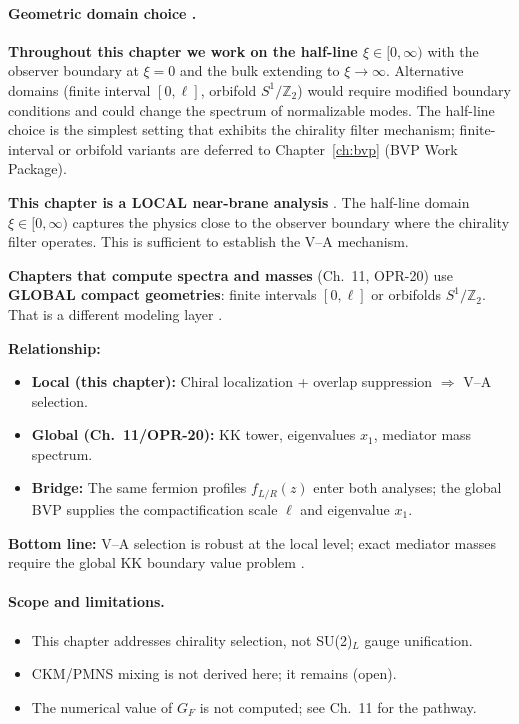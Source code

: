 \paragraph{Geometric domain choice \tagP{}.}
\textbf{Throughout this chapter we work on the half-line $\xi \in [0, \infty)$} with
the observer boundary at $\xi = 0$ and the bulk extending to $\xi \to \infty$.
Alternative domains (finite interval $[0, \ell]$, orbifold $S^1/\mathbb{Z}_2$)
would require modified boundary conditions and could change the spectrum of
normalizable modes. The half-line choice is the simplest setting that exhibits
the chirality filter mechanism; finite-interval or orbifold variants are
deferred to Chapter~\ref{ch:bvp} (BVP Work Package).

\begin{tcolorbox}[colback=blue!5!white, colframe=blue!50!black,
    title=\textbf{Local vs Global Geometry Map}]
\textbf{This chapter is a LOCAL near-brane analysis} \tagP{}. The half-line
domain $\xi \in [0, \infty)$ captures the physics close to the observer boundary
where the chirality filter operates. This is sufficient to establish the V--A
mechanism.

\textbf{Chapters that compute spectra and masses} (Ch.~11, OPR-20) use
\textbf{GLOBAL compact geometries}: finite intervals $[0, \ell]$ or orbifolds
$S^1/\mathbb{Z}_2$. That is a different modeling layer \tagDc{}.

\textbf{Relationship:}
\begin{itemize}[nosep]
    \item \textbf{Local (this chapter):} Chiral localization + overlap suppression
          $\Rightarrow$ V--A selection. \tagDc{}
    \item \textbf{Global (Ch.~11/OPR-20):} KK tower, eigenvalues $x_1$, mediator
          mass spectrum. \tagDc{}
    \item \textbf{Bridge:} The same fermion profiles $f_{L/R}(z)$ enter both
          analyses; the global BVP supplies the compactification scale $\ell$
          and eigenvalue $x_1$. \tagDc{}
\end{itemize}

\textbf{Bottom line:} V--A selection is robust at the local level; exact mediator
masses require the global KK boundary value problem \tagDc{}.
\end{tcolorbox}

\paragraph{Scope and limitations.}
\begin{itemize}[nosep]
    \item This chapter addresses chirality selection, not SU(2)$_L$ gauge unification.
    \item CKM/PMNS mixing is not derived here; it remains (open).
    \item The numerical value of $G_F$ is not computed; see Ch.~11 for the pathway.
\end{itemize}

